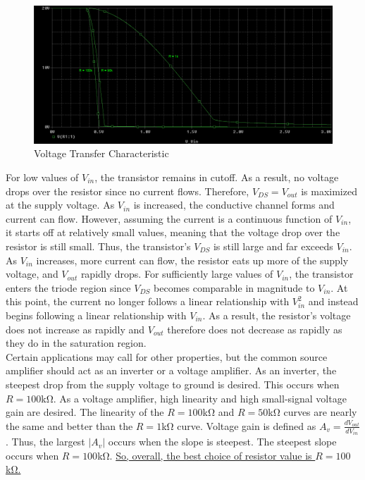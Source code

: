 \FloatBarrier

\begin{figure}[h!]
	\centering
	\includegraphics[scale=0.50]{./images/vout_vs_vin.PNG}
	\caption{Voltage Transfer Characteristic}
	\label{fig:vout_vs_vin}
\end{figure}

\FloatBarrier

For low values of $V_{in}$, the transistor remains in cutoff. As a result, no voltage drops over the resistor since no current flows. Therefore, $V_{DS} = V_{out}$ is maximized at the supply voltage. As $V_{in}$ is increased, the conductive channel forms and current can flow. However, assuming the current is a continuous function of $V_{in}$, it starts off at relatively small values, meaning that the voltage drop over the resistor is still small. Thus, the transistor's $V_{DS}$ is still large and far exceeds $V_{in}$. As $V_{in}$ increases, more current can flow, the resistor eats up more of the supply voltage, and $V_{out}$ rapidly drops. For sufficiently large values of $V_{in}$, the transistor enters the triode region since $V_{DS}$ becomes comparable in magnitude to $V_{in}$. At this point, the current no longer follows a linear relationship with $V_{in}^2$ and instead begins following a linear relationship with $V_{in}$. As a result, the resistor's voltage does not increase as rapidly and $V_{out}$ therefore does not decrease as rapidly as they do in the saturation region. \\

Certain applications may call for other properties, but the common source amplifier should act as an inverter or a voltage amplifier. As an inverter, the steepest drop from the supply voltage to ground is desired. This occurs when $R = 100$\si{\kilo\ohm}. As a voltage amplifier, high linearity and high small-signal voltage gain are desired. The linearity of the $R = 100$\si{\kilo\ohm} and $R = 50$\si{\kilo\ohm} curves are nearly the same and better than the $R = 1$\si{\kilo\ohm} curve. Voltage gain is defined as $A_v = \frac{dV_{out}}{dV_{in}}$. Thus, the largest $|A_v|$ occurs when the slope is steepest. The steepest slope occurs when $R = 100$\si{\kilo\ohm}. \uline{So, overall, the best choice of resistor value is $R = 100$\si{\kilo\ohm}.} \\

